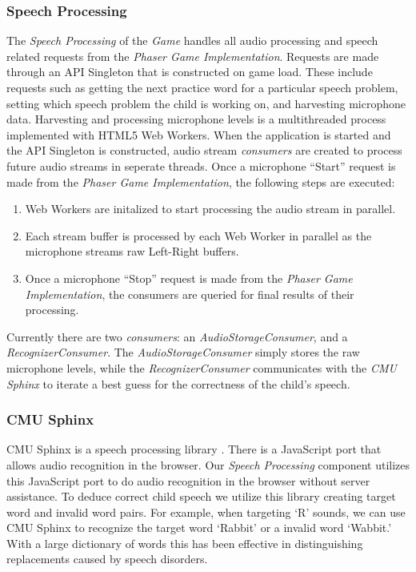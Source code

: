 \documentclass{sig-alternate-2013}
\begin{document}
\subsubsection{Speech Processing}
The {\em Speech Processing} of the {\em Game} handles all audio processing and speech related requests from the {\em Phaser Game Implementation}. Requests are made through an API Singleton that is constructed on game load. These include requests such as getting the next practice word for a particular speech problem, setting which speech problem the child is working on, and harvesting microphone data. Harvesting and processing microphone levels is a multithreaded process implemented with HTML5 Web Workers. When the application is started and the API Singleton is constructed, audio stream {\em consumers} are created to process future audio streams in seperate threads. Once a microphone ``Start'' request is made from the {\em Phaser Game Implementation}, the following steps are executed:
\vspace{-3 pt}
\begin{enumerate}
  \item Web Workers are initalized to start processing the audio stream in parallel.
  \vspace{-6 pt}
  \item Each stream buffer is processed by each Web Worker in parallel as the microphone streams raw Left-Right buffers.
  \vspace{-6 pt}
  \item Once a microphone ``Stop'' request is made from the {\em Phaser Game Implementation}, the consumers are queried for final results of their processing.
\end{enumerate}
\vspace{-3 pt}
Currently there are two {\em consumers}: an {\em AudioStorageConsumer}, and a {\em RecognizerConsumer}. The {\em AudioStorageConsumer} simply stores the raw microphone levels, while the {\em RecognizerConsumer} communicates with the {\em CMU Sphinx} to iterate a best guess for the correctness of the child's speech.

\subsubsection{CMU Sphinx}
CMU Sphinx is a speech processing library \cite{CMU:Sphinx}. There is a JavaScript port that allows audio recognition in the browser. Our {\em Speech Processing} component utilizes this JavaScript port to do audio recognition in the browser without server assistance. To deduce correct child speech we utilize this library creating target word and invalid word pairs. For example, when targeting `R' sounds, we can use CMU Sphinx to recognize the target word `Rabbit' or a invalid word `Wabbit.' With a large dictionary of words this has been effective in distinguishing replacements caused by speech disorders.
\end{document}
